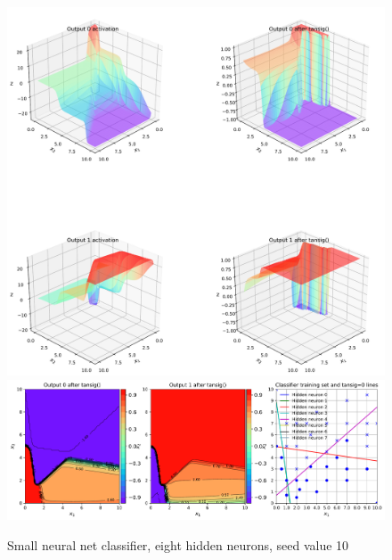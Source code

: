  
\begin{figure}[p]
\centering
\includegraphics[width=\textwidth]{pic/chC-classifa08}
\includegraphics[width=\textwidth]{pic/chC-classifb08}
\caption{Small neural net classifier, eight hidden neurons, seed value 10\label{fig:chC-classif08}}
\end{figure}
 
